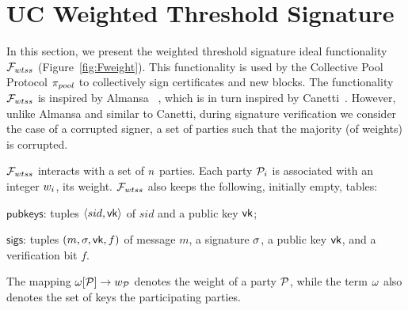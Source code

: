 \section{UC Weighted Threshold Signature}\label{sec:uc-weighted-tss}

In this section, we present the weighted threshold signature ideal functionality
${\mathcal{F}}_{wtss}$ (Figure~\ref{fig:Fweight}). This functionality is used by the
Collective Pool Protocol $\pi_{pool}$ to collectively sign certificates and new
blocks. The functionality ${\mathcal{F}}_{wtss}$ is inspired by Almansa
\etal~\cite{EC:AlmDamNie06}, which is in turn inspired by
Canetti~\cite{EPRINT:Canetti03}. However, unlike Almansa \etal and similar to
Canetti, during signature verification we consider the case of a corrupted
signer, \ie a set of parties such that the majority (of weights) is corrupted.

${\mathcal{F}}_{wtss}$ interacts with a set of $n$ parties. Each party
$\mathcal{P}_i$ is associated with an integer $w_i$, \ie its weight.
${\mathcal{F}}_{wtss}$ also keeps the following, initially empty, tables:
\begin{inparaenum}[i)]
    \item $\mathsf{pubkeys}$: tuples $\langle sid, \mathsf{vk} \rangle$ of $sid$
        and a public key $\mathsf{vk}$;
    \item $\mathsf{sigs}$: tuples $(m, \sigma, \mathsf{vk}, f)$ of message
        $m$, a signature $\sigma$, a public key $\mathsf{vk}$, and a
        verification bit $f$.
\end{inparaenum}
The mapping $\omega[\mathcal{P}] \rightarrow w_{\mathcal{P}}$ denotes the weight of a party
$\mathcal{P}$, while the term $\omega$ also denotes the set of keys the participating
parties.

